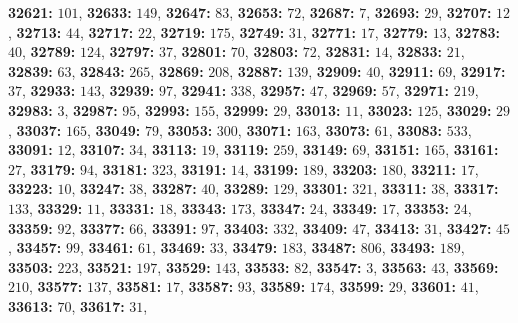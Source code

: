 \textsf{\bfseries 32621:} $101$, \textsf{\bfseries 32633:} $149$, \textsf{\bfseries 32647:} $83$, \textsf{\bfseries 32653:} $72$, \textsf{\bfseries 32687:} $7$, \textsf{\bfseries 32693:} $29$, \textsf{\bfseries 32707:} $12$, \textsf{\bfseries 32713:} $44$, \textsf{\bfseries 32717:} $22$, \textsf{\bfseries 32719:} $175$, \textsf{\bfseries 32749:} $31$, \textsf{\bfseries 32771:} $17$, \textsf{\bfseries 32779:} $13$, \textsf{\bfseries 32783:} $40$, \textsf{\bfseries 32789:} $124$, \textsf{\bfseries 32797:} $37$, \textsf{\bfseries 32801:} $70$, \textsf{\bfseries 32803:} $72$, \textsf{\bfseries 32831:} $14$, \textsf{\bfseries 32833:} $21$, \textsf{\bfseries 32839:} $63$, \textsf{\bfseries 32843:} $265$, \textsf{\bfseries 32869:} $208$, \textsf{\bfseries 32887:} $139$, \textsf{\bfseries 32909:} $40$, \textsf{\bfseries 32911:} $69$, \textsf{\bfseries 32917:} $37$, \textsf{\bfseries 32933:} $143$, \textsf{\bfseries 32939:} $97$, \textsf{\bfseries 32941:} $338$, \textsf{\bfseries 32957:} $47$, \textsf{\bfseries 32969:} $57$, \textsf{\bfseries 32971:} $219$, \textsf{\bfseries 32983:} $3$, \textsf{\bfseries 32987:} $95$, \textsf{\bfseries 32993:} $155$, \textsf{\bfseries 32999:} $29$, \textsf{\bfseries 33013:} $11$, \textsf{\bfseries 33023:} $125$, \textsf{\bfseries 33029:} $29$, \textsf{\bfseries 33037:} $165$, \textsf{\bfseries 33049:} $79$, \textsf{\bfseries 33053:} $300$, \textsf{\bfseries 33071:} $163$, \textsf{\bfseries 33073:} $61$, \textsf{\bfseries 33083:} $533$, \textsf{\bfseries 33091:} $12$, \textsf{\bfseries 33107:} $34$, \textsf{\bfseries 33113:} $19$, \textsf{\bfseries 33119:} $259$, \textsf{\bfseries 33149:} $69$, \textsf{\bfseries 33151:} $165$, \textsf{\bfseries 33161:} $27$, \textsf{\bfseries 33179:} $94$, \textsf{\bfseries 33181:} $323$, \textsf{\bfseries 33191:} $14$, \textsf{\bfseries 33199:} $189$, \textsf{\bfseries 33203:} $180$, \textsf{\bfseries 33211:} $17$, \textsf{\bfseries 33223:} $10$, \textsf{\bfseries 33247:} $38$, \textsf{\bfseries 33287:} $40$, \textsf{\bfseries 33289:} $129$, \textsf{\bfseries 33301:} $321$, \textsf{\bfseries 33311:} $38$, \textsf{\bfseries 33317:} $133$, \textsf{\bfseries 33329:} $11$, \textsf{\bfseries 33331:} $18$, \textsf{\bfseries 33343:} $173$, \textsf{\bfseries 33347:} $24$, \textsf{\bfseries 33349:} $17$, \textsf{\bfseries 33353:} $24$, \textsf{\bfseries 33359:} $92$, \textsf{\bfseries 33377:} $66$, \textsf{\bfseries 33391:} $97$, \textsf{\bfseries 33403:} $332$, \textsf{\bfseries 33409:} $47$, \textsf{\bfseries 33413:} $31$, \textsf{\bfseries 33427:} $45$, \textsf{\bfseries 33457:} $99$, \textsf{\bfseries 33461:} $61$, \textsf{\bfseries 33469:} $33$, \textsf{\bfseries 33479:} $183$, \textsf{\bfseries 33487:} $806$, \textsf{\bfseries 33493:} $189$, \textsf{\bfseries 33503:} $223$, \textsf{\bfseries 33521:} $197$, \textsf{\bfseries 33529:} $143$, \textsf{\bfseries 33533:} $82$, \textsf{\bfseries 33547:} $3$, \textsf{\bfseries 33563:} $43$, \textsf{\bfseries 33569:} $210$, \textsf{\bfseries 33577:} $137$, \textsf{\bfseries 33581:} $17$, \textsf{\bfseries 33587:} $93$, \textsf{\bfseries 33589:} $174$, \textsf{\bfseries 33599:} $29$, \textsf{\bfseries 33601:} $41$, \textsf{\bfseries 33613:} $70$, \textsf{\bfseries 33617:} $31$, 
